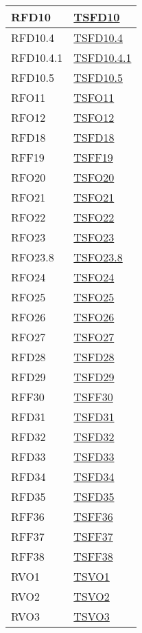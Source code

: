 \begin{longtable}[ht]{|>{\centering}m{5cm}|m{5cm}<{\centering}|}
RFD10 & \hyperlink{TVFD10}{TSFD10}\\ \hline
RFD10.4 & \hyperlink{TVFD10.4}{TSFD10.4}\\ \hline
RFD10.4.1 & \hyperlink{TVFD10.4.1}{TSFD10.4.1}\\ \hline
RFD10.5 & \hyperlink{TVFD10.5}{TSFD10.5}\\ \hline
RFO11 & \hyperlink{TVFO11}{TSFO11}\\ \hline
RFO12 & \hyperlink{TVFO12}{TSFO12}\\ \hline
RFD18 & \hyperlink{TVFD18}{TSFD18}\\ \hline
RFF19 & \hyperlink{TVFF19}{TSFF19}\\ \hline
RFO20 & \hyperlink{TVFO20}{TSFO20}\\ \hline
RFO21 & \hyperlink{TVFO21}{TSFO21}\\ \hline
RFO22 & \hyperlink{TVFO22}{TSFO22}\\ \hline
RFO23 & \hyperlink{TVFO23}{TSFO23}\\ \hline
RFO23.8 & \hyperlink{TVFO23.8}{TSFO23.8}\\ \hline
RFO24 & \hyperlink{TVFO24}{TSFO24}\\ \hline
RFO25 & \hyperlink{TVFO25}{TSFO25}\\ \hline
RFO26 & \hyperlink{TVFO26}{TSFO26}\\ \hline
RFO27 & \hyperlink{TVFO27}{TSFO27}\\ \hline
RFD28 & \hyperlink{TVFD28}{TSFD28}\\ \hline
RFD29 & \hyperlink{TVFD29}{TSFD29}\\ \hline
RFF30 & \hyperlink{TVFF30}{TSFF30}\\ \hline
RFD31 & \hyperlink{TVFD31}{TSFD31}\\ \hline
RFD32 & \hyperlink{TVFD32}{TSFD32}\\ \hline
RFD33 & \hyperlink{TVFD33}{TSFD33}\\ \hline
RFD34 & \hyperlink{TVFD34}{TSFD34}\\ \hline
RFD35 & \hyperlink{TVFD35}{TSFD35}\\ \hline
RFF36 & \hyperlink{TVFF36}{TSFF36}\\ \hline
RFF37 & \hyperlink{TVFF37}{TSFF37}\\ \hline
RFF38 & \hyperlink{TVFF38}{TSFF38}\\ \hline
RVO1 & \hyperlink{TVVO1}{TSVO1}\\ \hline
RVO2 & \hyperlink{TVVO2}{TSVO2}\\ \hline
RVO3 & \hyperlink{TVVO3}{TSVO3}\\ \hline

\end{longtable}
